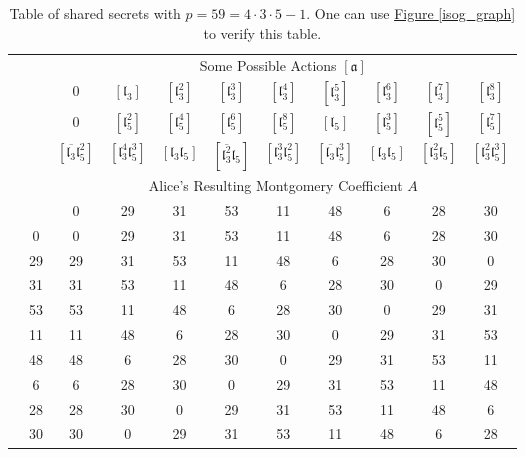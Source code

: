 \documentclass[openany, a4paper, 10pt]{book}
\theoremstyle{plain}
\theoremstyle{plain}
\theoremstyle{plain}
\theoremstyle{definition}
\theoremstyle{plain}
\theoremstyle{definition}
\theoremstyle{remark}
\newcommand{\figref}[1]{\hyperref[#1]{Figure \ref{#1}}}
\begin{document}
\begin{table}[ht]
    \begin{center}
        \setlength\tabcolsep{4pt}
        \begin{tabular}{|c|c||c|c|c|c|c|c|c|c|c|}
            \cline{3-11}
            \multicolumn{1}{c}{} & & \multicolumn{9}{|c|}{Some Possible Actions $[\mathfrak a]$} \\
            \cline{3-11}
            \multicolumn{1}{c}{} & & $0$ & $[\mathfrak l_3]$ & $[\mathfrak l_3^2]$ & $[\mathfrak l_3^3]$ & $[\mathfrak l_3^4]$ & $[\mathfrak l_3^5]$ & $[\mathfrak l_3^6]$ & $[\mathfrak l_3^7]$ & $[\mathfrak l_3^8]$ \\
            \multicolumn{1}{c}{} & & $0$ & $[\mathfrak l_5^2]$ & $[\mathfrak l_5^4]$ & $[\mathfrak l_5^6]$ & $[\mathfrak l_5^8]$ & $[\mathfrak l_5]$ & $[\mathfrak l_5^3]$ & $[\mathfrak l_5^5]$ & $[\mathfrak l_5^7]$ \\
            \multicolumn{1}{c}{} & & $[\overline{\mathfrak l_3}\mathfrak l_5^2]$ & $[\mathfrak l_3^4 \mathfrak l_5^3]$ & $[\mathfrak l_3 \mathfrak l_5]$ & $[\overline{\mathfrak l_3^2} \mathfrak l_5]$ & $[\mathfrak l_3^3\mathfrak l_5^2]$ & $[\overline{\mathfrak l_3} \mathfrak l_5^3]$ & $[\mathfrak l_3\mathfrak l_5]$ & $[\mathfrak l_3^2 \mathfrak l_5]$ & $[\mathfrak l_3^2 \mathfrak l_5^3]$ \\
            \cline{3-11}
            \multicolumn{1}{c}{} & & \multicolumn{9}{|c|}{Alice's Resulting Montgomery Coefficient $A$} \\
            \cline{3-11}
            \multicolumn{1}{c}{} & & 0 & 29 & 31 & 53 & 11 & 48 & 6 & 28 & 30 \\
            \hline
            \hline
            \parbox[t]{3mm}{} & 0 & 0 & 29 & 31 & 53 & 11 & 48 & 6 & 28 & 30 \\
            & 29 & 29 & 31 & 53 & 11 & 48 & 6 & 28 & 30 & 0 \\
            & 31 & 31 & 53 & 11 & 48 & 6 & 28 & 30 & 0 & 29 \\
            & 53 & 53 & 11 & 48 & 6 & 28 & 30 & 0 & 29 & 31 \\
            & 11 & 11 & 48 & 6 & 28 & 30 & 0 & 29 & 31 & 53 \\
            & 48 & 48 & 6 & 28 & 30 & 0 & 29 & 31 & 53 & 11 \\
            & 6 & 6 & 28 & 30 & 0 & 29 & 31 & 53 & 11 & 48 \\
            & 28 & 28 & 30 & 0 & 29 & 31 & 53 & 11 & 48 & 6 \\
            & 30 & 30 & 0 & 29 & 31 & 53 & 11 & 48 & 6 & 28 \\
            \hline
        \end{tabular}
    \end{center}
    \vspace{-1em}
    \caption{Table of shared secrets with $p=59 = 4\cdot 3 \cdot 5 - 1$. One can use \figref{isog_graph} to verify this table.}
    \label{shared_secrets}
\end{table}
\end{document}
